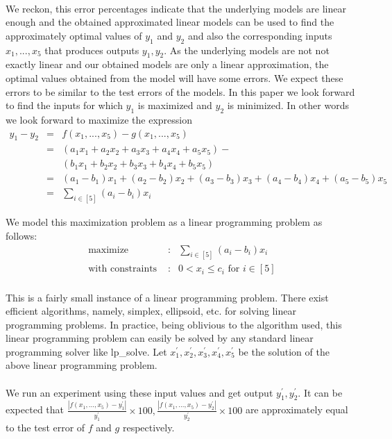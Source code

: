 \documentclass[12pt]{article}
\begin{document}
\paragraph{}
We reckon, this error percentages indicate that the underlying models are linear enough and the obtained approximated linear models can be used to find the approximately optimal values of $y_1$ and $y_2$ and also the corresponding inputs $x_1,...,x_5$ that produces outputs $y_1,y_2$. As the underlying models are not not exactly linear and our obtained models are only a linear approximation, the optimal values obtained from the model will have some errors. We expect these errors to be similar to the test errors of the models. In this paper we look forward to find the inputs for which $y_1$ is maximized and $y_2$ is minimized. In other words we look forward to maximize the expression
\begin{eqnarray*}
y_1 - y_2 &=& f(x_1,...,x_5) - g(x_1,...,x_5)\\
&=& (a_1x_1 + a_2x_2 + a_3x_3 + a_4x_4 + a_5x_5) - \\ & &(b_1x_1 + b_2x_2 + b_3x_3 + b_4x_4 + b_5x_5)\\
&=& (a_1 - b_1)x_1 + (a_2 - b_2)x_2 + (a_3 - b_3)x_3 + (a_4 - b_4)x_4 + (a_5 - b_5)x_5\\
&=& \sum_{i \in [5]} (a_i-b_i)x_i
\end{eqnarray*}

We model this maximization problem as a linear programming problem as follows:
\begin{eqnarray*}
\text{ maximize } &:& \sum_{i \in [5]} (a_i-b_i)x_i \\
\text{ with constraints } &:& 0 < x_i \leq c_i \text{ for } i \in [5]\\
\end{eqnarray*} 


This is a fairly small instance of a linear programming problem. There exist efficient algorithms, namely, simplex, ellipsoid, etc. for solving linear programming problems. In practice, being oblivious to the algorithm used, this linear programming problem can easily be solved by any standard linear programming solver like lp\_solve. Let $x_1^{'},x_2^{'},x_3^{'},x_4^{'},x_5^{'}$ be the solution of the above linear programming problem. 

\paragraph{}
We run an experiment using these input values and get output $y_1^{'},y_2^{'}$. It can be expected that $\frac{|f(x_1,...,x_5)-y_1^{'}|}{y_1^{'}} \times 100, \frac{|f(x_1,...,x_5)-y_2^{'}|}{y_2^{'}} \times 100$ are approximately equal to the test error of $f$ and $g$ respectively.
\end{document}
